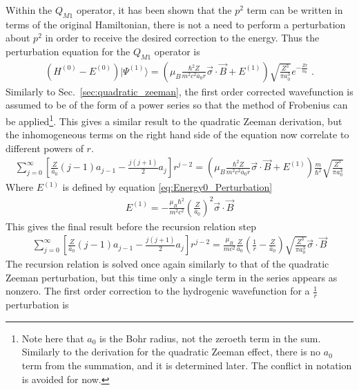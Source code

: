             Within the $Q_{M1}$ operator, it has been shown that the $p^2$ term can be written in terms of the original Hamiltonian, there is not a need to perform a perturbation about $p^2$ in order to receive the desired correction to the energy. Thus the perturbation equation for the $Q_{M1}$ operator is
            \begin{align}
                \left(H^{(0)} - E^{(0)}\right) \vert \varPsi^{(1)}\rangle = \left(\mu_B \frac{\hbar^2 Z}{m^2 c^2 \bar{a}_0 r} \vec{\sigma} \cdot \vec{B} + E^{(1)} \right) \sqrt{\frac{Z^3}{\pi a_0^3}}e^{-\frac{Zr}{a_0}}\;.
            \end{align}
            \noindent Similarly to Sec.~\ref{sec:quadratic_zeeman}, the first order corrected wavefunction is assumed to be of the form of a power series so that the method of Frobenius can be applied\footnote{Note here that $a_0$ is the Bohr radius, not the zeroeth term in the sum. Similarly to the derivation for the quadratic Zeeman effect, there is no $a_0$ term from the summation, and it is determined later. The conflict in notation is avoided for now.}. This gives a similar result to the quadratic Zeeman derivation, but the inhomogeneous terms on the right hand side of the equation now correlate to different powers of $r$.
            \begin{align}
                \sum_{j = 0}^\infty \left[ \frac{Z}{\bar{a}_0}(j-1)a_{j-1} - \frac{j(j+1)}{2} a_j \right] r^{j -2} = \left(\mu_B \frac{\hbar^2 Z}{m^2 c^2 \bar{a}_0 r} \vec{\sigma} \cdot \vec{B} + E^{(1)} \right) \frac{m}{\hbar^2}\sqrt{\frac{Z^3}{\pi a_0^3}}
            \end{align}
            \noindent Where $E^{(1)}$ is defined by equation \eqref{eq:Energy0_Perturbation}
            \begin{align}
                E^{(1)} = - \frac{\mu_B \hbar^2}{m^2c^2} \left( \frac{Z}{\bar{a}_0} \right)^2 \vec{\sigma}\cdot \vec{B}
            \end{align}
            \noindent This gives the final result before the recursion relation step
            \begin{align}
                \sum_{j = 0}^\infty \left[ \frac{Z}{\bar{a}_0}(j-1)a_{j-1} - \frac{j(j+1)}{2} a_j \right] r^{j -2} =  \frac{\mu_B}{m c^2} \frac{Z}{\bar{a}_0}\left(\frac{1}{r} - \frac{Z}{\bar{a}_0} \right) \sqrt{\frac{Z^3}{\pi a_0^3}}\vec{\sigma} \cdot \vec{B}
            \end{align}
            \noindent The recursion relation is solved once again similarly to that of the quadratic Zeeman perturbation, but this time only a single term in the series appears as nonzero. The first order correction to the hydrogenic wavefunction for a $\frac{1}{r}$ perturbation is 
